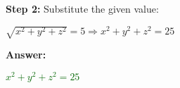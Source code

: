 \documentclass[10pt]{article}                               %
\begin{document}
\begin{adjustwidth}{2em}{0pt}
\begin{adjustwidth}{2em}{0pt}
\begin{examplebox}
\begin{adjustwidth}{2em}{0pt}
                    \textbf{Step 2:} Substitute the given value:
            
                    \vspace{0.25em}
            
                    \( \sqrt{x^2 + y^2 + z^2} = 5 \Rightarrow x^2 + y^2 + z^2 = 25 \)
            
                    \vspace{0.5em}
            
                    \textbf{Answer:}
            
                    \vspace{0.25em}
            
                    \textcolor{darkgreen}{\( x^2 + y^2 + z^2 = 25 \)}
            
                \end{adjustwidth}
            
            \end{examplebox}

    \end{adjustwidth}

\end{adjustwidth}
\end{document}
